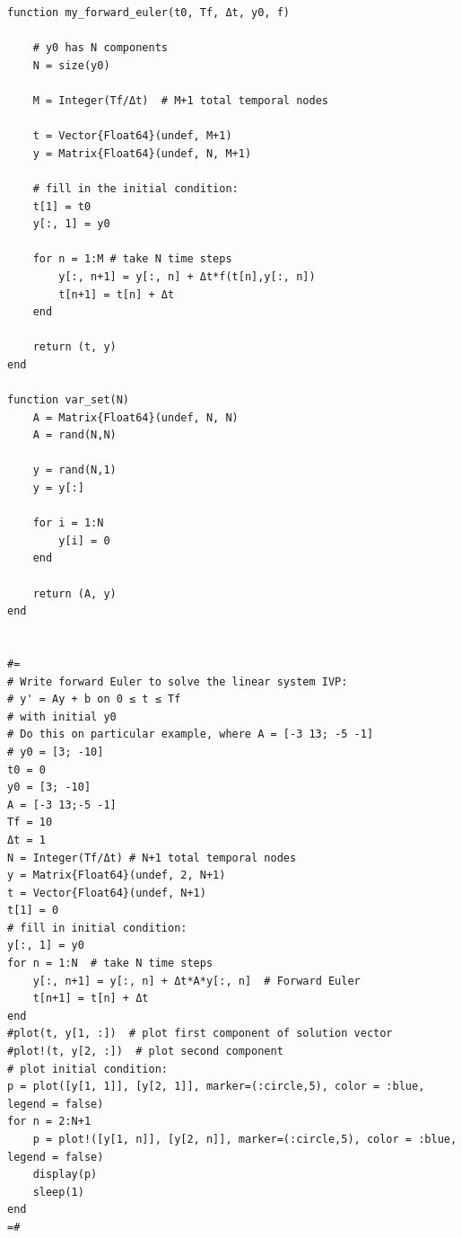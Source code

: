\documentclass[a4paper,10pt,BCOR10mm,oneside,headsepline]{scrartcl}
\begin{document}
\begin{lstlisting}
function my_forward_euler(t0, Tf, Δt, y0, f)

    # y0 has N components
    N = size(y0)

    M = Integer(Tf/Δt)  # M+1 total temporal nodes

    t = Vector{Float64}(undef, M+1)
    y = Matrix{Float64}(undef, N, M+1)

    # fill in the initial condition:
    t[1] = t0
    y[:, 1] = y0

    for n = 1:M # take N time steps
        y[:, n+1] = y[:, n] + Δt*f(t[n],y[:, n])
        t[n+1] = t[n] + Δt
    end

    return (t, y)
end

function var_set(N)
    A = Matrix{Float64}(undef, N, N)
    A = rand(N,N)

    y = rand(N,1)
    y = y[:]

    for i = 1:N
        y[i] = 0
    end

    return (A, y)
end


#=
# Write forward Euler to solve the linear system IVP:
# y' = Ay + b on 0 ≤ t ≤ Tf
# with initial y0
# Do this on particular example, where A = [-3 13; -5 -1]
# y0 = [3; -10]
t0 = 0
y0 = [3; -10]
A = [-3 13;-5 -1]
Tf = 10
Δt = 1
N = Integer(Tf/Δt) # N+1 total temporal nodes
y = Matrix{Float64}(undef, 2, N+1)
t = Vector{Float64}(undef, N+1)
t[1] = 0
# fill in initial condition:
y[:, 1] = y0
for n = 1:N  # take N time steps
    y[:, n+1] = y[:, n] + Δt*A*y[:, n]  # Forward Euler
    t[n+1] = t[n] + Δt
end
#plot(t, y[1, :])  # plot first component of solution vector
#plot!(t, y[2, :])  # plot second component
# plot initial condition:
p = plot([y[1, 1]], [y[2, 1]], marker=(:circle,5), color = :blue, legend = false)
for n = 2:N+1
    p = plot!([y[1, n]], [y[2, n]], marker=(:circle,5), color = :blue, legend = false)
    display(p)
    sleep(1)
end
=#

\end{lstlisting}
\end{document}
